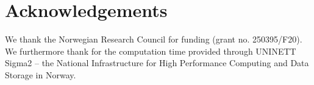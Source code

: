 
\section*{Acknowledgements}

We thank the Norwegian Research Council for funding (grant no. 250395/F20). We furthermore thank for the computation time provided through UNINETT Sigma2 – the National Infrastructure for High Performance Computing and Data Storage in Norway.
